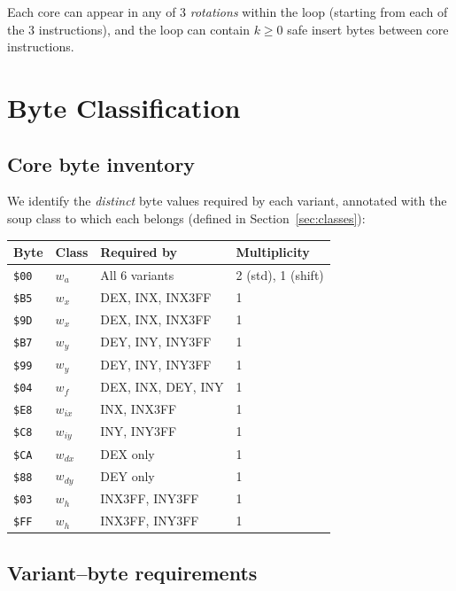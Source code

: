 \documentclass{article}
\newcommand{\hex}[1]{\texttt{\$#1}}
\newcommand{\wa}{w_a}
\newcommand{\wf}{w_f}
\newcommand{\wx}{w_x}
\newcommand{\wy}{w_y}
\newcommand{\wix}{w_{ix}}
\newcommand{\wiy}{w_{iy}}
\newcommand{\wdx}{w_{dx}}
\newcommand{\wdy}{w_{dy}}
\newcommand{\wh}{w_h}
\begin{document}
Each core can appear in any of 3 \emph{rotations} within the loop
(starting from each of the 3 instructions), and the loop can contain
$k \geq 0$ safe insert bytes between core instructions.

\section{Byte Classification}
\label{sec:classification}

\subsection{Core byte inventory}

We identify the \emph{distinct} byte values required by each variant,
annotated with the soup class to which each belongs (defined in
Section~\ref{sec:classes}):

\begin{center}
\begin{tabular}{@{}llll@{}}
\toprule
\textbf{Byte} & \textbf{Class} & \textbf{Required by} & \textbf{Multiplicity} \\
\midrule
\hex{00} & $\wa$ & All 6 variants & 2 (std), 1 (shift) \\
\hex{B5} & $\wx$ & DEX, INX, INX3FF & 1 \\
\hex{9D} & $\wx$ & DEX, INX, INX3FF & 1 \\
\hex{B7} & $\wy$ & DEY, INY, INY3FF & 1 \\
\hex{99} & $\wy$ & DEY, INY, INY3FF & 1 \\
\hex{04} & $\wf$ & DEX, INX, DEY, INY & 1 \\
\hex{E8} & $\wix$ & INX, INX3FF & 1 \\
\hex{C8} & $\wiy$ & INY, INY3FF & 1 \\
\hex{CA} & $\wdx$ & DEX only & 1 \\
\hex{88} & $\wdy$ & DEY only & 1 \\
\hex{03} & $\wh$ & INX3FF, INY3FF & 1 \\
\hex{FF} & $\wh$ & INX3FF, INY3FF & 1 \\
\bottomrule
\end{tabular}
\end{center}

\subsection{Variant--byte requirements}
\end{document}
